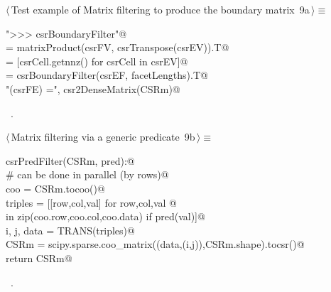 \documentclass[11pt,oneside]{article}	%
\begin{document}
\begin{flushleft} \small \label{scrap15}
\protect{}$\langle\,$Test example of Matrix filtering to produce the boundary matrix\nobreak\ {\footnotesize 9a}$\,\rangle\equiv$
\vspace{-1ex}
\begin{list}{}{} \item
\mbox{}\verb@print "\n>>> csrBoundaryFilter"@\\
\mbox{}\verb@csrEF = matrixProduct(csrFV, csrTranspose(csrEV)).T@\\
\mbox{}\verb@facetLengths = [csrCell.getnnz() for csrCell in csrEV]@\\
\mbox{}\verb@CSRm = csrBoundaryFilter(csrEF, facetLengths).T@\\
\mbox{}\verb@print "\ncsrMaxFilter(csrFE) =\n", csr2DenseMatrix(CSRm)@\\
\mbox{}\verb@@{\NWsep}
\end{list}
\vspace{-1ex}
\footnotesize\addtolength{\baselineskip}{-1ex}
\begin{list}{}{\setlength{\itemsep}{-\parsep}\setlength{\itemindent}{-\leftmargin}}
\item \NWtxtMacroRefIn\ .
\end{list}
\end{flushleft}
\begin{flushleft} \small \label{scrap16}
\protect{}$\langle\,$Matrix filtering via a generic predicate\nobreak\ {\footnotesize 9b}$\,\rangle\equiv$
\vspace{-1ex}
\begin{list}{}{} \item
\mbox{}\verb@def csrPredFilter(CSRm, pred):@\\
\mbox{}\verb@   # can be done in parallel (by rows)@\\
\mbox{}\verb@   coo = CSRm.tocoo()@\\
\mbox{}\verb@   triples = [[row,col,val] for row,col,val @\\
\mbox{}\verb@            in zip(coo.row,coo.col,coo.data) if pred(val)]@\\
\mbox{}\verb@   i, j, data = TRANS(triples)@\\
\mbox{}\verb@   CSRm = scipy.sparse.coo_matrix((data,(i,j)),CSRm.shape).tocsr()@\\
\mbox{}\verb@   return CSRm@\\
\mbox{}\verb@@{\NWsep}
\end{list}
\vspace{-1ex}
\footnotesize\addtolength{\baselineskip}{-1ex}
\begin{list}{}{\setlength{\itemsep}{-\parsep}\setlength{\itemindent}{-\leftmargin}}
\item \NWtxtMacroRefIn\ .
\end{list}
\end{flushleft}
\end{document}
